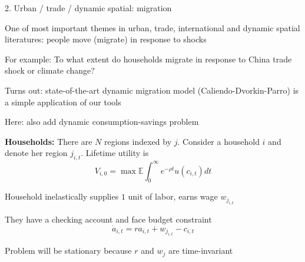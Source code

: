 \documentclass[11pt, aspectratio=169]{beamer}
\newenvironment{witemize}{\itemize\addtolength{\itemsep}{10pt}}{\enditemize}
\begin{document}
\begin{frame}{2. Urban / trade / dynamic spatial: migration}
\begin{witemize}
\item One of most important themes in urban, trade, international and dynamic spatial literatures: people move (migrate) in response to shocks

	{\footnotesize For example: To what extent do households migrate in response to China trade shock or climate change?}

\item Turns out: state-of-the-art dynamic migration model (Caliendo-Dvorkin-Parro) is a simple application of our tools

\item Here: also add dynamic consumption-savings problem
\end{witemize}
\end{frame}


\begin{frame}{}

\textbf{Households:} 
There are $N$ regions indexed by $j$. Consider a household $i$ and denote her region $j_{i, t}$. Lifetime utility is 
\begin{equation*}
	V_{i, 0} = \max \mathbb E \int_0^\infty e^{- \rho t} u(c_{i, t}) dt
\end{equation*}

\begin{witemize}
\item Household inelastically supplies $1$ unit of labor, earns wage $w_{j_{i, t}}$

\item They have a checking account and face budget constraint 
\begin{equation*}
	\dot a_{i, t} = r a_{i, t} + w_{j_{i, t}} - c_{i, t}
\end{equation*}

\item Problem will be stationary because $r$ and $w_j$ are time-invariant
\end{witemize}
\end{frame}
\end{document}
